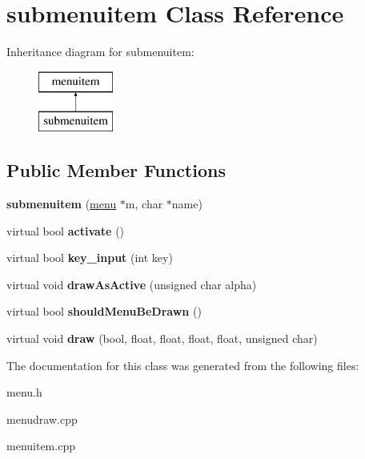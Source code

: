 \hypertarget{classsubmenuitem}{\section{submenuitem Class Reference}
\label{classsubmenuitem}
}
Inheritance diagram for submenuitem\-:\begin{figure}[H]
\begin{center}
\leavevmode
\includegraphics[height=2.000000cm]{classsubmenuitem}
\end{center}
\end{figure}
\subsection*{Public Member Functions}
\begin{DoxyCompactItemize}
\item 
\hypertarget{classsubmenuitem_a5b5cfc826ecfdd28bcadc5c4e0ab4e37}{{\bfseries submenuitem} (\hyperlink{classmenu}{menu} $\ast$m, char $\ast$name)}\label{classsubmenuitem_a5b5cfc826ecfdd28bcadc5c4e0ab4e37}

\item 
\hypertarget{classsubmenuitem_a5f2cc91e9d33890273b1e753243d083b}{virtual bool {\bfseries activate} ()}\label{classsubmenuitem_a5f2cc91e9d33890273b1e753243d083b}

\item 
\hypertarget{classsubmenuitem_ab270e28911151f45565ef5dd5843a1c3}{virtual bool {\bfseries key\-\_\-input} (int key)}\label{classsubmenuitem_ab270e28911151f45565ef5dd5843a1c3}

\item 
\hypertarget{classsubmenuitem_a8e9b02aa94b2047c2322f1d093ca7a86}{virtual void {\bfseries draw\-As\-Active} (unsigned char alpha)}\label{classsubmenuitem_a8e9b02aa94b2047c2322f1d093ca7a86}

\item 
\hypertarget{classsubmenuitem_ab8812b45b622f1d6ee2f7c0f35da08e9}{virtual bool {\bfseries should\-Menu\-Be\-Drawn} ()}\label{classsubmenuitem_ab8812b45b622f1d6ee2f7c0f35da08e9}

\item 
\hypertarget{classsubmenuitem_ae222458c62f3b2299b59db12cd71a2ec}{virtual void {\bfseries draw} (bool, float, float, float, float, unsigned char)}\label{classsubmenuitem_ae222458c62f3b2299b59db12cd71a2ec}

\end{DoxyCompactItemize}


The documentation for this class was generated from the following files\-:\begin{DoxyCompactItemize}
\item 
menu.\-h\item 
menudraw.\-cpp\item 
menuitem.\-cpp\end{DoxyCompactItemize}
